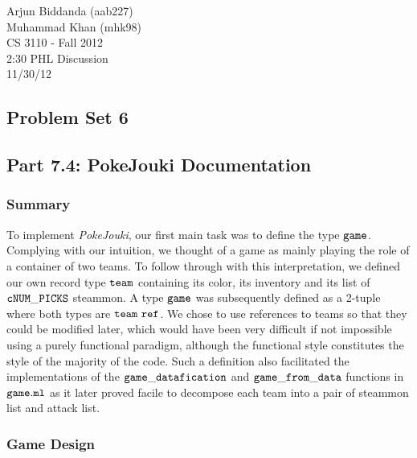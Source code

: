 \documentclass[10pt]{article}
\begin{document}
\noindent
Arjun Biddanda (aab227)\\
Muhammad Khan (mhk98)\\
CS 3110 - Fall 2012\\
2:30 PHL Discussion\\
11/30/12\\
\begin{center}
\section*{Problem Set 6}
\subsection*{Part 7.4: PokeJouki Documentation}
\end{center}
\subsubsection*{Summary}

To implement \textit{PokeJouki}, our first main task was to define the type $\tt{game}$. Complying with our intuition, we thought of a game as mainly playing the role of a container of two teams. To follow through with this interpretation, we defined our own record type $\tt{team}$ containing its color, its inventory and its list of $\tt{cNUM\_PICKS}$ steammon. A type $\tt{game}$ was subsequently defined as a 2-tuple where both types are $\tt{team\ ref}$. We chose to use references to teams so that they could be modified later, which would have been very difficult if not impossible using a purely functional paradigm, although the functional style constitutes the style of the majority of the code. Such a definition also facilitated the implementations of the $\tt{game\_datafication}$ and $\tt{game\_from\_data}$ functions in $\tt{game.ml}$ as it later proved facile to decompose each team into a pair of steammon list and attack list.

\subsubsection*{Game Design}
\end{document}
